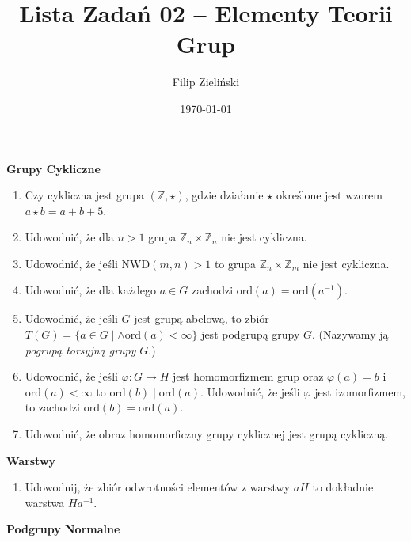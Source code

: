 \documentclass{article}
\title{Lista Zadań 02 --  Elementy Teorii Grup}
\author{Filip Zieliński}
\date{\today}
\newcommand{\ord}{\textrm{ord}}
\let\phi\varphi
\begin{document}
\maketitle

 \textbf{Grupy Cykliczne} 
\begin{enumerate}
    \item Czy cykliczna jest grupa $(\mathbb{Z}, \star)$, gdzie działanie $\star$ określone jest wzorem $a \star b = a + b + 5$.
    \item Udowodnić, że dla $n > 1$ grupa $\mathbb{Z}_n \times \mathbb{Z}_n$ nie jest cykliczna.
    \item Udowodnić, że jeśli NWD$(m,n) > 1$ to grupa $\mathbb{Z}_n \times \mathbb{Z}_m$ nie jest cykliczna.
    \item Udowodnić, że dla każdego $a \in G$ zachodzi $\ord (a) = \ord (a^{-1})$.
    \item Udowodnić, że jeśli $G$ jest grupą abelową, to zbiór  \\ $T(G) = \{ a \in G \mid  \land \ord (a) < \infty \}$ jest podgrupą grupy $G$. (Nazywamy ją \textit{pogrupą torsyjną grupy} $G$.)
    \item Udowodnić, że jeśli $\phi : G \rightarrow H$ jest homomorfizmem grup oraz $\phi (a) = b$ i $\ord (a) < \infty$ to $\ord (b) \mid \ord (a)$. Udowodnić, że jeśli $\phi$ jest izomorfizmem, to zachodzi $\ord (b) = \ord (a)$. 
    \item Udowodnić, że obraz homomorficzny grupy cyklicznej jest grupą cykliczną.
\end{enumerate}
\textbf{Warstwy}
\begin{enumerate}[resume]
    \item  Udowodnij, że zbiór odwrotności elementów z warstwy $aH$ to dokładnie warstwa $Ha^{-1}$.
\end{enumerate}
\textbf{Podgrupy Normalne}
\end{document}
